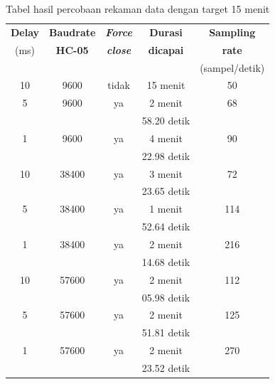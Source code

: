 \begin{table}[H]
	\caption{Tabel hasil percobaan rekaman data dengan target 15 menit}
	\begin{tabular}{|c|c|c|c|c|}
		\hline
		\multicolumn{1}{|c|}{{\color[HTML]{000000} \textbf{Delay}}} & \multicolumn{1}{|c|}{\textbf{Baudrate}} &
		\multicolumn{1}{|c|}{ \textbf{\textit{Force}}} &
		\multicolumn{1}{|c|}{\textbf{Durasi}} &
		\multicolumn{1}{|c|}{\textbf{Sampling}}  \\
		(ms) &  \textbf{HC-05}  & \textbf{\textit{close}}  & \textbf{dicapai} & \textbf{rate}  \\
		&  &  &   & (sampel/detik)  \\ \hline
		
		10 & 9600 & tidak & 15 menit & 50  \\ \hline
		5 & 9600 & ya & 2 menit & 68  \\
		& & & 58.20 detik & \\ \hline
		1 & 9600 & ya & 4 menit & 90  \\ & & & 22.98 detik & \\\hline
		10 & 38400 & ya & 3 menit & 72  \\ & & & 23.65 detik & \\\hline
		5 & 38400 & ya & 1 menit & 114  \\ & & & 52.64 detik & \\ \hline
		1 & 38400 & ya & 2 menit & 216  \\ & & & 14.68 detik & \\ \hline
		10 & 57600 & ya & 2 menit & 112  \\ & & & 05.98 detik & \\ \hline
		5 & 57600 & ya & 2 menit & 125  \\ & & & 51.81 detik & \\ \hline
		1 & 57600 & ya & 2 menit & 270  \\ & & & 23.52 detik & \\ \hline
		
	\end{tabular}
	\vspace{1ex}
	
	\label{tabel:4.0.0}
\end{table}

